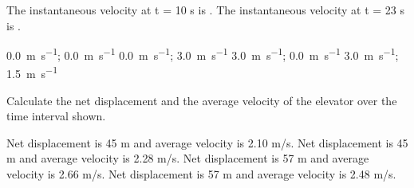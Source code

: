 \documentclass[answers]{exam}
\begin{document}
\begin{questions}
\begin{questions}
\question \label{ques:Unit02_Elevator1}

The instantaneous velocity at t = 10 s is \underline{\hspace{2cm}}. The instantaneous velocity at t = 23 s is \underline{\hspace{2cm}}.

\begin{choices}
\choice \SI[per-mode=symbol]{0.0}{\meter\per\second}; \SI[per-mode=symbol]{0.0}{\meter\per\second}
\choice \SI[per-mode=symbol]{0.0}{\meter\per\second}; \SI[per-mode=symbol]{3.0}{\meter\per\second}
\CorrectChoice \SI[per-mode=symbol]{3.0}{\meter\per\second}; \SI[per-mode=symbol]{0.0}{\meter\per\second}
\choice \SI[per-mode=symbol]{3.0}{\meter\per\second}; \SI[per-mode=symbol]{1.5}{\meter\per\second}
\end{choices}

\question \label{ques:Unit02_Elevator2}

Calculate the net displacement and the average velocity of the elevator over the time interval shown.

\begin{choices}
\choice Net displacement is 45 m and average velocity is 2.10 m/s.
\choice Net displacement is 45 m and average velocity is 2.28 m/s.
\choice Net displacement is 57 m and average velocity is 2.66 m/s.
\CorrectChoice Net displacement is 57 m and average velocity is 2.48 m/s.
\end{choices}





\end{questions}







\end{questions}
\end{document}
